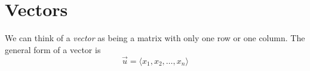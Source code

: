 \section{Vectors}\label{vectors}
We can think of a \emph{vector} as being a matrix with only one row or one
column. The general form of a vector is 
\begin{equation*}
    \vec{u} = \langle x_1, x_2, \hdots, x_n \rangle
\end{equation*}


